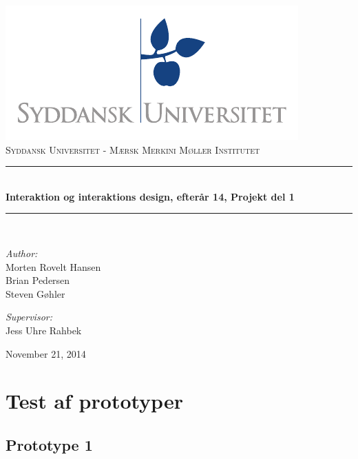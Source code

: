 \documentclass[a4paper,titlepage,fleqn,12pt]{article}
\begin{document}
\begin{titlepage}
	\begin{center}
	\includegraphics[scale=1.5,page=7]{sdu_logos.pdf}~\\[0.5cm]
	\textsc{\Large{Syddansk Universitet - Mærsk Merkini Møller Institutet}} \\[0.2cm]
	\rule{12cm}{1pt} \\[0.4cm]
	{ \huge \bfseries Interaktion og interaktions design, efterår 14, Projekt del 1 \\[0.4cm] }
	\rule{12cm}{1pt} \\[1.5cm]
	
	\begin{minipage}{0.4\textwidth}
		\begin{flushleft} \large
			\textit{Author:}\\
			Morten Rovelt Hansen\\
			Brian Pedersen\\
			Steven Gøhler\\
		\end{flushleft}
	\end{minipage}
	\begin{minipage}{0.4\textwidth}
		\begin{flushright} \large
			\textit{Supervisor:} \\
			Jess Uhre Rahbek
		\end{flushright}
	\end{minipage}
	
	\vfill
	
	{\large November 21, 2014}
	\end{center}
	\newpage
\end{titlepage}

\tableofcontents
\newpage

\section{Test af prototyper}

\subsection{Prototype 1}
\end{document}
